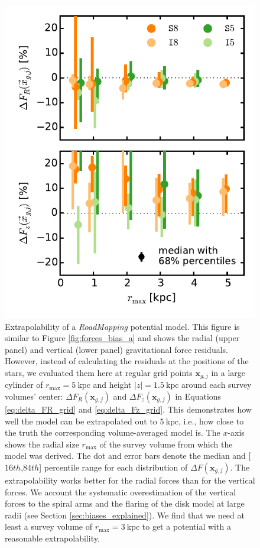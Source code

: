 \documentclass[iop,revtex4,numberedappendix,appendixfloats]{emulateapj}
\newcommand{\vect}[1]{\boldsymbol{#1}}
\newcommand{\RM}{{\sl RoadMapping}}
\begin{document}
\begin{figure}[!htbp]
\centering
  \includegraphics[width=\columnwidth]{fig/MNdHHdiffSph2_bias_in_forces_recovery_3_b.pdf}
  \caption{Extrapolability of a \RM{} potential model. This figure is similar to Figure \ref{fig:forces_bias_a} and shows the radial (upper panel) and vertical (lower panel) gravitational force residuals. However, instead of calculating the residuals at the positions of the stars, we evaluated them here at regular grid points $\vect{x}_{g,j}$ in a large cylinder of $r_\text{max}=5~\text{kpc}$ and height $|z|=1.5~\text{kpc}$ around each survey volumes' center: $\Delta F_{R}(\vect{x}_{g,j})$ and $\Delta F_{z}(\vect{x}_{g,j})$ in Equations \eqref{eq:delta_FR_grid} and \eqref{eq:delta_Fz_grid}. This demonstrates how well the model can be extrapolated out to $5~\text{kpc}$, i.e., how close to the truth the corresponding volume-averaged model is. The $x$-axis shows the radial size $r_\text{max}$ of the survey volume from which the model was derived. The dot and error bars denote the median and [$16th$,$84th$] percentile range for each distribution of $\Delta F(\vect{x}_{g,j})$. The extrapolability works better for the radial forces than for the vertical forces. We account the systematic overestimation of the vertical forces to the spiral arms and the flaring of the disk model at large radii (see Section \ref{sec:biases_explained}). We find that we need at least a survey volume of $r_\text{max}=3~\text{kpc}$ to get a potential with a reasonable extrapolability.}
\label{fig:forces_bias_b}
\end{figure}
\end{document}
